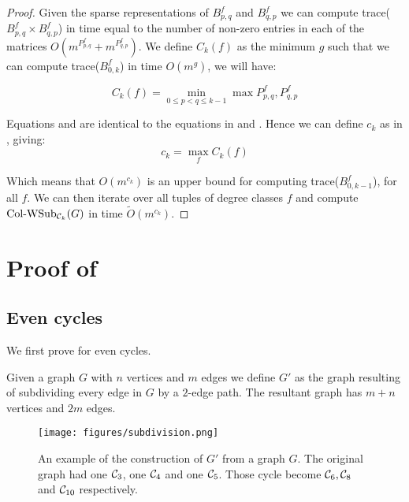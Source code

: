 \documentclass[a4paper,UKenglish,cleveref, autoref, numberwithinsect, thm-restate]{lipics-v2021}
\newcommand{\cycle}[1]{\cC_{#1}}
\newcommand{\expandG}{G'}
\newcommand{\WSub}[2]{\mathrm{\text{Col-WSub}}_{#2}(#1)}
\newcommand{\cC}{{\cal C}}
\begin{document}
\begin{proof}
			Given the sparse representations of $B^f_{p,q}$ and $B^f_{q,p}$ we can compute trace($B^f_{p,q}\times B^f_{q,p}$) in time equal to the number of non-zero entries in each of the matrices $O(m^{P^f_{p,q}}+ m^{P^f_{q,p}})$. We define $C_k(f)$ as the minimum $g$ such that we can compute trace($B^f_{0,k}$) in time $O(m^g)$, we will have:
			
			\begin{equation}\label{eq:cycle2}
				C_k(f) = \min_{0\leq p < q \leq k-1} \max{P^f_{p,q},P^f_{q,p}}
			\end{equation}
			
			Equations  and  are identical to the equations in \cite{GiLeSh+23} and \cite{DaVuWi19}. Hence we can define $c_k$ as in \cite{GiLeSh+23}, giving:
			\begin{equation}
				c_k = \max_f C_k(f)
			\end{equation} 
			
			Which means that $O(m^{c_k})$ is an upper bound for computing trace($B^f_{0,k-1}$), for all $f$. We can then iterate over all tuples of degree classes $f$ and compute $\WSub{G}{\cycle{k}}$ in time $\tilde{O}(m^{c_k})$.
			
		\end{proof}
	
	\section{Proof of }
		
		\subsection{Even cycles}
			We first prove  for even cycles.
			\begin{definition} 
				Given a graph $G$ with $n$ vertices and $m$ edges we define $\expandG$ as the graph resulting of subdividing every edge in $G$ by a $2$-edge path. The resultant graph has $m+n$ vertices and $2m$ edges.
			\end{definition}
		
		\begin{figure}
			\centering
			\texttt{[image: figures/subdivision.png]}\caption{An example of the construction of $\expandG$ from a graph $G$. The original graph had one $\cycle{3}$, one $\cycle{4}$ and one $\cycle{5}$. Those cycle become $\cycle{6},\cycle{8}$ and $\cycle{10}$ respectively.}
			\label{fig:subdivision}
		\end{figure}
		
\end{document}
